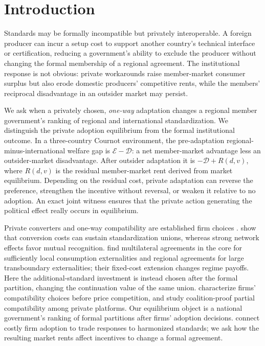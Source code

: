 \section{Introduction}\label{sec:short-intro}
Standards may be formally incompatible but privately interoperable. A foreign producer can incur a setup cost to support another country's technical interface or certification, reducing a government's ability to exclude the producer without changing the formal membership of a regional agreement. The institutional response is not obvious: private workarounds raise member-market consumer surplus but also erode domestic producers' competitive rents, while the members' reciprocal disadvantage in an outsider market may persist.

We ask when a privately chosen, \emph{one-way} adaptation changes a regional member government's ranking of regional and international standardization. We distinguish the private adoption equilibrium from the formal institutional outcome. In a three-country Cournot environment, the pre-adaptation regional-minus-international welfare gap is $\mathscr E-\mathscr D$: a net member-market advantage less an outsider-market disadvantage. After outsider adaptation it is $-\mathscr D+R(d,v)$, where $R(d,v)$ is the residual member-market rent derived from market equilibrium. Depending on the residual cost, private adaptation can reverse the preference, strengthen the incentive without reversal, or weaken it relative to no adoption. An exact joint witness ensures that the private action generating the political effect really occurs in equilibrium.

Private converters and one-way compatibility are established firm choices \citep{farrellSaloner1992,manentiSomma2008}. \citet{gandalShy2001} show that conversion costs can sustain standardization unions, whereas strong network effects favor mutual recognition. \citet{takaradaEtAl2020} find multilateral agreements in the core for sufficiently local consumption externalities and regional agreements for large transboundary externalities; their fixed-cost extension changes regime payoffs. Here the additional-standard investment is instead chosen after the formal partition, changing the continuation value of the same union. \citet{innocentiMenicucci2021} characterize firms' compatibility choices before price competition, and \citet{dingKoShen2022} study coalition-proof partial compatibility among private platforms. Our equilibrium object is a national government's ranking of formal partitions after firms' adoption decisions. \citet{schmidtSteingress2022} connect costly firm adoption to trade responses to harmonized standards; we ask how the resulting market rents affect incentives to change a formal agreement.

